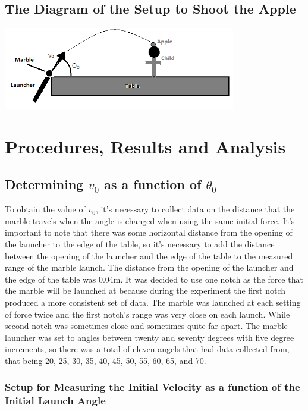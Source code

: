 \documentclass[aps,letterpaper,11pt]{revtex4}
\begin{document}
\subsection{The Diagram of the Setup to Shoot the Apple}

\begin{center}
\includegraphics[width=4in]{Setup.png}
\end{center}

\section{Procedures, Results and Analysis}

\subsection{Determining $v_0$ as a function of $\theta_0$}

To obtain the value of $v_0$, it's necessary to collect data on the distance that the marble travels when the angle is changed when using the same initial force. It's important to note that there was some horizontal distance from the opening of the launcher to the edge of the table, so it's necessary to add the distance between the opening of the launcher and the edge of the table to the measured range of the marble launch. The distance from the opening of the launcher and the edge of the table was 0.04m.  It was decided to use one notch as the force that the marble will be launched at because during the experiment the first notch produced a more consistent set of data. The marble was launched at each setting of force twice and the first notch's range was very close on each launch. While second notch was sometimes close and sometimes quite far apart. The marble launcher was set to angles between twenty and seventy degrees with five degree increments, so there was a total of eleven angels that had data collected from, that being 20, 25, 30, 35, 40, 45, 50, 55, 60, 65, and 70.   

\subsubsection{Setup for Measuring the Initial Velocity as a function of the Initial Launch Angle}
\end{document}

